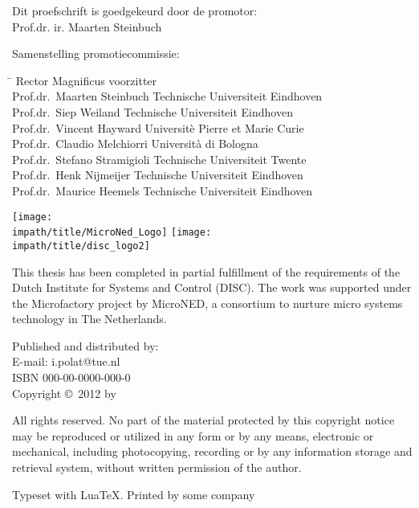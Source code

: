 \newpage %
\thispagestyle{empty}

\noindent Dit proefschrift is goedgekeurd door de promotor:\\
Prof.dr. ir. Maarten Steinbuch\\
\bigskip{}

\noindent Samenstelling promotiecommissie:
\smallskip{}
\noindent
\begin{flushleft}\begin{tabbing}
\hspace*{50mm}\=\kill
Rector Magnificus \> voorzitter\\
Prof.dr.\ Maarten Steinbuch   \> Technische Universiteit Eindhoven\\
Prof.dr.\ Siep Weiland        \> Technische Universiteit Eindhoven\\
Prof.dr.\ Vincent Hayward     \> Universitè Pierre et Marie Curie\\
Prof.dr.\ Claudio Melchiorri  \> Università di Bologna\\
Prof.dr.\ Stefano Stramigioli \> Technische Universiteit Twente\\
Prof.dr.\ Henk Nijmeijer       \> Technische Universiteit Eindhoven\\
Prof.dr.\ Maurice Heemels     \> Technische Universiteit Eindhoven\\
\end{tabbing}\end{flushleft}
\smallskip\noindent
{
\flushleft\texttt{[image: \\impath/title/MicroNed\_Logo]}\hspace*{0.75cm}
\vspace{1em}
\texttt{[image: \\impath/title/disc\_logo2]}
\vspace{1em}


\parbox{\textwidth}{\noindent This thesis has been completed in partial fulfillment of
the requirements of the Dutch Institute for Systems and Control
(DISC). The work was supported under the Microfactory project by
MicroNED, a consortium to nurture micro systems technology in
The Netherlands.
}
\bigskip{}


Published and distributed by: \theauthor \\
E-mail: i.polat@tue.nl\\

\bigskip{}
ISBN 000-00-0000-000-0\\
Copyright \copyright~2012 by \theauthor
}


\bigskip{}
\noindent All rights reserved. No part of the material protected by
this copyright notice may be reproduced or utilized in any form or
by any means, electronic or mechanical, including photocopying,
recording or by any information storage and retrieval system,
without written permission of the author.

\bigskip{}
\noindent Typeset with Lua\kern-0.9bp\TeX. Printed by some company

